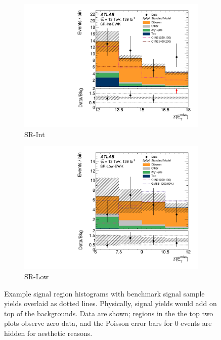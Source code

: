 \begin{figure}[tp]
\begin{subfigure}{0.49\textwidth}
    \includegraphics[width=\textwidth]{figures/2ljets_sr_int_met_sig.pdf}
    \caption{SR-Int}
\end{subfigure}
\hfill
\begin{subfigure}{0.49\textwidth}
    \centering
    \includegraphics[width=\textwidth]{figures/2ljets_sr_low_met_sig.pdf}
    \caption{SR-Low}
\end{subfigure}
\caption{%
Example signal region histograms with benchmark signal sample yields overlaid
as dotted lines.
Physically, signal yields would add on top of the backgrounds.
Data are shown; regions in the the top two plots observe zero data, and the
Poisson error bars for $0$ events are hidden for aesthetic reasons.
}
\label{fig:2ljets_signal_examples}
\end{figure}



